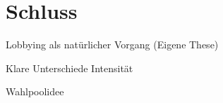 \section{Schluss}
\begin{itemize*}
\item Lobbying als natürlicher Vorgang (Eigene These)
\item Klare Unterschiede Intensität
\item Wahlpoolidee
\end{itemize*}

\newpage



\listoftodos


